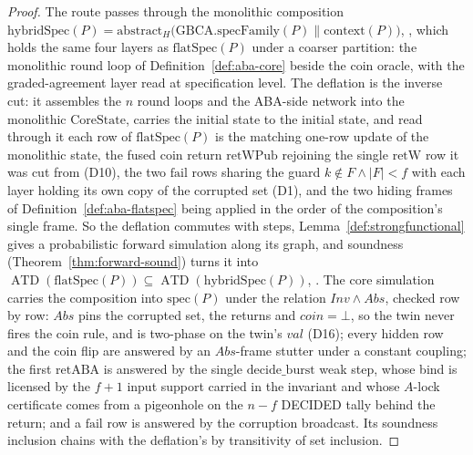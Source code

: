 \begin{proof}\leanok
  The route passes through the monolithic composition $\mathrm{hybridSpec}(P) = \mathrm{abstract}_H\bigl(\mathrm{GBCA.specFamily}(P) \parallel \mathrm{context}(P)\bigr)$, , which holds the same four layers as $\mathrm{flatSpec}(P)$ under a coarser partition: the monolithic round loop of Definition~\ref{def:aba-core} beside the coin oracle, with the graded-agreement layer read at specification level.
  The deflation  is the inverse cut: it assembles the $n$ round loops and the ABA-side network into the monolithic $\mathrm{CoreState}$, carries the initial state to the initial state, and read through it each row of $\mathrm{flatSpec}(P)$ is the matching one-row update of the monolithic state, the fused coin return $\mathrm{retWPub}$ rejoining the single $\mathrm{retW}$ row it was cut from (D10), the two $\mathrm{fail}$ rows sharing the guard $k \notin F \wedge |F| < f$ with each layer holding its own copy of the corrupted set (D1), and the two hiding frames of Definition~\ref{def:aba-flatspec} being applied in the order of the composition's single frame.
  So the deflation commutes with steps, Lemma~\ref{def:strongfunctional} gives a probabilistic forward simulation along its graph, and soundness (Theorem~\ref{thm:forward-sound}) turns it into $\operatorname{ATD}(\mathrm{flatSpec}(P)) \subseteq \operatorname{ATD}(\mathrm{hybridSpec}(P))$, .
  The core simulation  carries the composition into $\mathrm{spec}(P)$ under the relation $Inv \wedge Abs$, checked row by row: $Abs$ pins the corrupted set, the returns and $coin = \bot$, so the twin never fires the coin rule, and is two-phase on the twin's $val$ (D16); every hidden row and the coin flip are answered by an $Abs$-frame stutter under a constant coupling; the first $\mathrm{retABA}$ is answered by the single $\mathrm{decide\_burst}$ weak step, whose bind is licensed by the $f{+}1$ input support carried in the invariant and whose $A$-lock certificate comes from a pigeonhole on the $n-f$ DECIDED tally behind the return; and a $\mathrm{fail}$ row is answered by the corruption broadcast.
  Its soundness inclusion chains with the deflation's by transitivity of set inclusion.
\end{proof}
